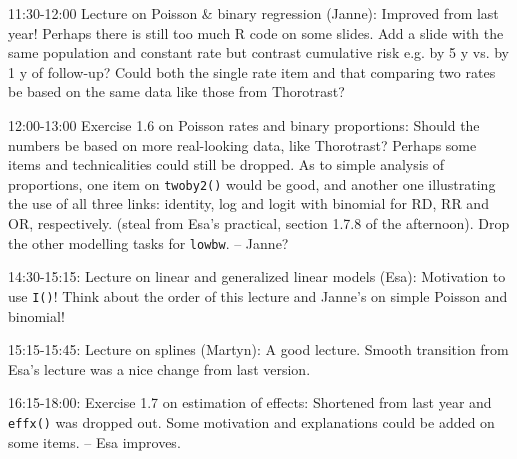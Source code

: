 \documentclass[11pt,a4]{article}
\begin{document}

11:30-12:00 Lecture on Poisson \& binary regression (Janne): 
Improved from last year! Perhaps there is still too much R code on some slides.
Add a slide with the same population and constant rate but contrast cumulative risk 
e.g. by 5 y vs. by 1 y of follow-up?
Could both the single rate item and that comparing two rates be based on the 
same data like those from Thorotrast?

12:00-13:00 Exercise 1.6 on Poisson rates and binary proportions:
Should the numbers be based on more real-looking data, like Thorotrast?
Perhaps some items and technicalities could still be dropped.
As to simple analysis of proportions, one item on \texttt{twoby2()} would be good, and another one
illustrating the use of all three links: identity, log and logit with binomial for RD, RR and OR, respectively.
(steal from Esa's practical, section 1.7.8 of the afternoon). 
Drop the other modelling tasks for \texttt{lowbw}. -- Janne? 




14:30-15:15:
Lecture on linear and generalized linear models (Esa):
Motivation to use \texttt{I()}! Think about the order of this lecture and Janne's on 
simple Poisson and binomial!
 
15:15-15:45: Lecture on splines (Martyn): 
A good lecture. Smooth transition from Esa's lecture was a nice change from last version. 

16:15-18:00: Exercise 1.7 on estimation of effects: 
Shortened from last year and \texttt{effx()} was dropped out.
Some motivation and explanations could be added on some items.
-- Esa improves. 
\end{document}
